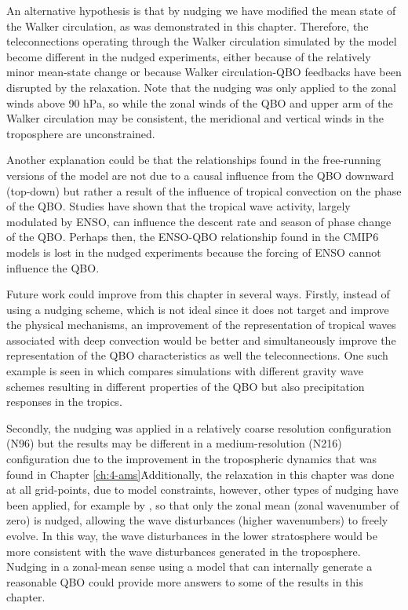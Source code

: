 An alternative hypothesis is that by nudging we have modified the mean state of the Walker circulation, as was demonstrated in this chapter. Therefore, the teleconnections operating through the Walker circulation simulated by the model become different in the nudged experiments, either because of the relatively minor mean-state change or because Walker circulation-QBO feedbacks have been disrupted by the relaxation. Note that the nudging was only applied to the zonal winds above 90 hPa, so while the zonal winds of the QBO and upper arm of the Walker circulation may be consistent, the meridional and vertical winds in the troposphere are unconstrained.  

Another explanation could be that the relationships found in the free-running versions of the model are not due to a causal influence from the QBO downward (top-down) but rather a result of the influence of tropical convection on the phase of the QBO. Studies \citep[e.g.][]{schirber2015,christiansen2016} have shown that the tropical wave activity, largely modulated by ENSO, can influence the descent rate and season of phase change of the QBO. Perhaps then, the ENSO-QBO relationship found in the CMIP6 models is lost in the nudged experiments because the forcing of ENSO cannot influence the QBO. 

Future work could improve from this chapter in several ways. 
Firstly, instead of using a nudging scheme, which is not ideal since it does not target and improve the physical mechanisms,  an improvement of the representation of tropical waves associated with deep convection would be better and simultaneously improve the representation of the QBO characteristics as well the teleconnections. One such example is seen in \cite{serva2021} which compares simulations with different gravity wave schemes resulting in different properties of the QBO but also precipitation responses in the tropics.
 
Secondly, the nudging was applied in a relatively coarse resolution configuration (N96) but the results may be different in a medium-resolution (N216) configuration due to the improvement in the tropospheric dynamics that was found in Chapter \ref{ch:4-ams}\. 
Additionally, the relaxation in this chapter was done at all grid-points, due to model constraints, however, other types of nudging have been applied, for example by \cite{martin2021}, so that only the zonal mean (zonal wavenumber of zero) is nudged, allowing the wave disturbances (higher wavenumbers) to freely evolve. In this way, the wave disturbances in the lower stratosphere would be more consistent with the wave disturbances generated in the troposphere. Nudging in a zonal-mean sense using a model that can internally generate a reasonable QBO could provide more answers to some of the results in this chapter.

